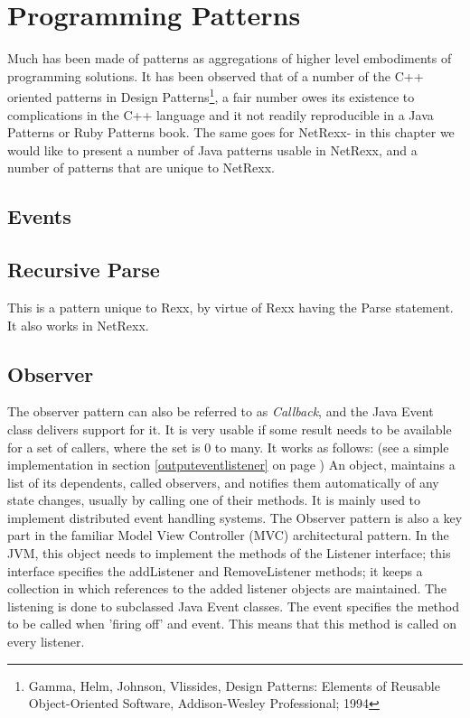 {{\chapter{Programming Patterns}
Much has been made of patterns as aggregations of higher level
embodiments of programming solutions.  It has been observed that of a
number of the C++ oriented patterns in Design Patterns\footnote{Gamma,
Helm, Johnson, Vlissides, Design
Patterns: Elements of Reusable Object-Oriented Software, Addison-Wesley Professional; 1994}, a fair number owes its existence
to complications in the C++ language and it not readily reproducible
in a Java Patterns or Ruby Patterns book. The same goes for NetRexx-
in this chapter we would like to present a number of Java patterns
usable in NetRexx, and a number of patterns that are unique to NetRexx.
\section{Events}\label{events}

\section{Recursive Parse}
This is a pattern unique to Rexx, by virtue of Rexx having the Parse
statement. It also works in NetRexx.

\section{Observer}
The observer pattern can also be referred to as \emph{Callback}, and
the Java Event class delivers support for it. It is very usable if
some result needs to be available for a set of callers, where the set
is 0 to many. It works as follows: (see a simple implementation in
section \ref{outputeventlistener} on page
\pageref{outputeventlistener})
An object, maintains a list of its dependents, called observers, and
notifies them automatically of any state changes, usually by calling
one of their methods. It is mainly used to implement distributed event
handling systems. The Observer pattern is also a key part in the
familiar Model View Controller (MVC) architectural pattern. In the
JVM, this object needs to implement the methods of the Listener
interface; this interface specifies the addListener and RemoveListener
methods; it keeps a collection in which references to the added
listener objects are maintained. The listening is done to subclassed
Java Event classes. The event specifies the method to be called when
'firing off' and event. This means that this method is called on every
listener.

}}
